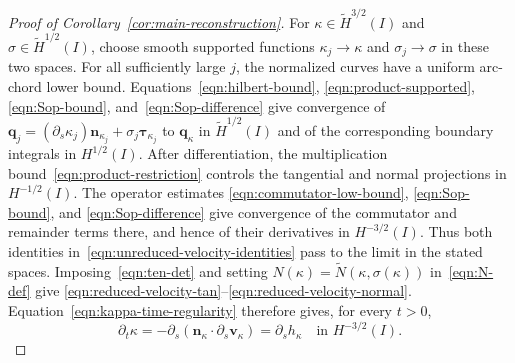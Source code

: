 \documentclass[11pt,reqno]{amsart}
\theoremstyle{plain}
\theoremstyle{definition}
\numberwithin{equation}{section}
\newcommand{\paren}[1]{\left(#1\right)}
\newcommand{\p}{\partial}
\newcommand{\wt}[1]{\widetilde{#1}}
\newcommand{\bm}[1]{\boldsymbol{#1}}
\newcommand{\nk}{\bm n_\kappa}
\newcommand{\thi}[1]{\wt H^{#1}(I)}
\begin{document}
\begin{proof}[Proof of Corollary~\ref{cor:main-reconstruction}]
For $\kappa\in\thi{3/2}$ and $\sigma\in\thi{1/2}$, choose smooth
supported functions $\kappa_j\to\kappa$ and $\sigma_j\to\sigma$ in
these two spaces. For all sufficiently large $j$, the normalized curves
have a uniform arc-chord lower bound. Equations~\eqref{eqn:hilbert-bound}, \eqref{eqn:product-supported}, \eqref{eqn:Sop-bound}, and~\eqref{eqn:Sop-difference} give convergence of
$\bm q_j=(\p_s\kappa_j)\bm n_{\kappa_j}+\sigma_j\bm\tau_{\kappa_j}$
to $\bm q_\kappa$ in $\thi{1/2}$ and of the corresponding boundary
integrals in $H^{1/2}(I)$. After differentiation, the multiplication
bound~\eqref{eqn:product-restriction} controls the tangential and normal
projections in $H^{-1/2}(I)$. The operator estimates
\eqref{eqn:commutator-low-bound}, \eqref{eqn:Sop-bound}, and
\eqref{eqn:Sop-difference} give convergence of the commutator and
remainder terms there, and hence of their derivatives in $H^{-3/2}(I)$.
Thus both identities in~\eqref{eqn:unreduced-velocity-identities}
pass to the limit in the stated spaces. Imposing~\eqref{eqn:ten-det} and setting $N(\kappa)=\wt N(\kappa,\sigma(\kappa))$ in~\eqref{eqn:N-def} give
\eqref{eqn:reduced-velocity-tan}--\eqref{eqn:reduced-velocity-normal}.
Equation~\eqref{eqn:kappa-time-regularity} therefore gives, for every $t>0$,
\begin{equation}\label{eqn:kappa-velocity-form}
    \p_t\kappa
    =-\p_s\paren{\nk\cdot\p_s\bm v_\kappa}
    =\p_sh_\kappa
    \quad\text{in }H^{-3/2}(I).
\end{equation}


\end{proof}
\end{document}
